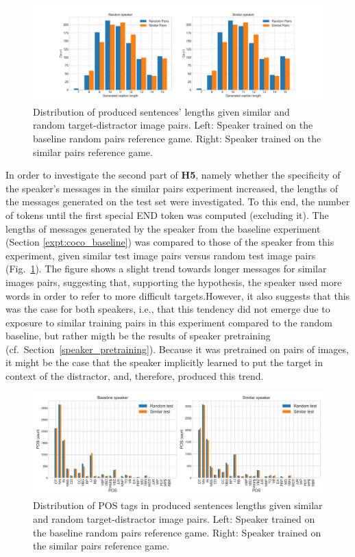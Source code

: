 \begin{figure}[h]
	\centering
	\includegraphics[width=\linewidth]{images/coco_random_similar_length_counts.png}
	\caption{Distribution of produced sentences' lengths given similar and random target-distractor image pairs. Left: Speaker trained on the baseline random pairs reference game. Right: Speaker trained on the similar pairs reference game.}
	\label{fig:coco_similar_random_speaker_lengths}
\end{figure}
In order to investigate the second part of \textbf{H5}, namely whether the specificity of the speaker's messages in the similar pairs experiment increased, the lengths of the messages generated on the test set were investigated. To this end, the number of tokens until the first special END token was computed (excluding it). The lengths of messages generated by the speaker from the baseline experiment (Section \ref{expt:coco_baseline}) was compared to those of the speaker from this experiment, given similar test image pairs versus random test image pairs (Fig.~\ref{fig:coco_similar_random_speaker_lengths}). The figure shows a slight trend towards longer messages for similar images pairs, suggesting that, supporting the hypothesis, the speaker used more words in order to refer to more difficult targets.However, it also suggests that this was the case for both speakers, i.e., that this tendency did not emerge due to exposure to similar training pairs in this experiment compared to the random baseline, but rather migth be the results of speaker pretraining (cf.~Section~\ref{speaker_pretraining}). Because it was pretrained on pairs of images, it might be the case that the speaker implicitly learned to put the target in context of the distractor, and, therefore, produced this trend.
\begin{figure}[h]
	\centering
	\includegraphics[width=\linewidth]{images/coco_similar_v_baseline_randomTest_vs_similarTest_POS_counts.png}
	\caption{Distribution of POS tags in produced sentences lengths given similar and random target-distractor image pairs. Left: Speaker trained on the baseline random pairs reference game. Right: Speaker trained on the similar pairs reference game.}
	\label{fig:coco_similar_random_speaker_POS}
\end{figure}
